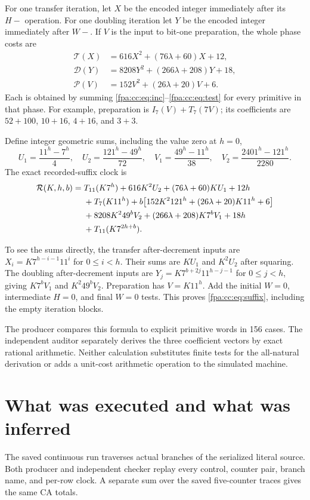 \documentclass[11pt,a4paper]{article}
\numberwithin{equation}{section}
\newcommand{\lam}{\lambda}
\begin{document}
For one transfer iteration, let $X$ be the encoded integer immediately
after its $H-$ operation. For one doubling iteration let $Y$ be the
encoded integer immediately after $W-$. If $V$ is the input to bit-one
preparation, the whole phase costs are
\begin{align}
 \mathcal T(X)&=616X^2+(76\lam+60)X+12,\label{fpa:cc:eq:transfer}\\
 \mathcal D(Y)&=8208Y^2+(266\lam+208)Y+18,\label{fpa:cc:eq:double}\\
 \mathcal P(V)&=152V^2+(26\lam+20)V+6.\label{fpa:cc:eq:prepare}
\end{align}
Each is obtained by summing \eqref{fpa:cc:eq:inc}--\eqref{fpa:cc:eq:test} for every
primitive in that phase. For example, preparation is $I_7(V)+T_7(7V)$;
its coefficients are $52+100$, $10+16$, $4+16$, and $3+3$.

Define integer geometric sums, including the value zero at $h=0$,
\[
 U_1=\frac{11^h-7^h}{4},\quad U_2=\frac{121^h-49^h}{72},\quad
 V_1=\frac{49^h-11^h}{38},\quad V_2=\frac{2401^h-121^h}{2280}.
\]
The exact recorded-suffix clock is
\begin{align}
 \mathcal R(K,h,b)={}&T_{11}(K7^h)
       +616K^2U_2+(76\lam+60)KU_1+12h\notag\\
 &+T_7(K11^h)
       +b\bigl[152K^2 121^h+(26\lam+20)K11^h+6\bigr]\notag\\
 &+8208K^2 49^bV_2+(266\lam+208)K7^bV_1+18h\notag\\
 &+T_{11}(K7^{2h+b}).
 \label{fpa:cc:eq:suffix}
\end{align}

To see the sums directly, the transfer after-decrement inputs are
$X_i=K7^{h-i-1}11^i$ for $0\leq i<h$. Their sums are $KU_1$ and
$K^2U_2$ after squaring. The doubling after-decrement inputs are
$Y_j=K7^{b+2j}11^{h-j-1}$ for $0\leq j<h$, giving $K7^bV_1$ and
$K^2 49^bV_2$. Preparation has $V=K11^h$. Add the initial $W=0$,
intermediate $H=0$, and final $W=0$ tests. This proves
\eqref{fpa:cc:eq:suffix}, including the empty iteration blocks.

The producer compares this formula to explicit primitive words in 156
cases. The independent auditor separately derives the three coefficient
vectors by exact rational arithmetic. Neither calculation substitutes
finite tests for the all-natural derivation or adds a unit-cost arithmetic
operation to the simulated machine.
\newpage

\section{What was executed and what was inferred}
\label{fpa:cc:sec:evidence}
The saved continuous run traverses actual branches of the serialized literal
source. Both producer and independent checker replay every control,
counter pair, branch name, and per-row clock. A separate sum over the
saved five-counter traces gives the same CA totals.
\end{document}
